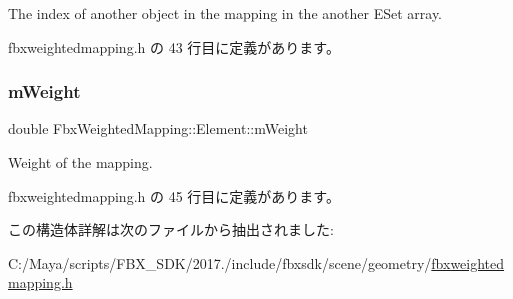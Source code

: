 The index of another object in the mapping in the another E\+Set array. 



 fbxweightedmapping.\+h の 43 行目に定義があります。

\mbox{\label{struct_fbx_weighted_mapping_1_1_element_aa078b1f7b0a995f487530342dc9b0038}} 
\subsubsection{\texorpdfstring{m\+Weight}{mWeight}}
{\footnotesize\ttfamily double Fbx\+Weighted\+Mapping\+::\+Element\+::m\+Weight}



Weight of the mapping. 



 fbxweightedmapping.\+h の 45 行目に定義があります。



この構造体詳解は次のファイルから抽出されました\+:\begin{DoxyCompactItemize}
\item 
C\+:/\+Maya/scripts/\+F\+B\+X\+\_\+\+S\+D\+K/2017./include/fbxsdk/scene/geometry/\hyperlink{fbxweightedmapping_8h}{fbxweightedmapping.\+h}\end{DoxyCompactItemize}

